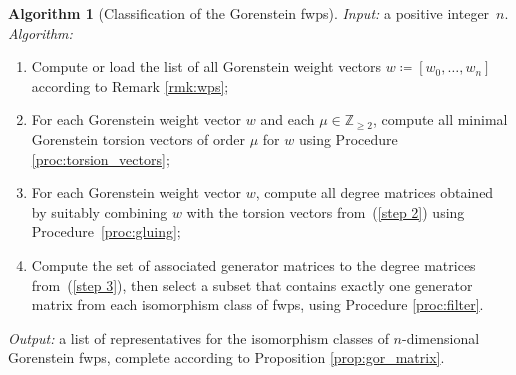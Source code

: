 \documentclass{amsart}
\newcommand{\Z}{\mathbb{Z}}
\theoremstyle{definition}
\newtheorem{algorithm}[lem]{Algorithm}
\begin{document}
\begin{algorithm}[Classification of the Gorenstein fwps]\label{algo:classification}
\emph{Input:} a positive integer~$n$.
\emph{Algorithm:}
\begin{enumerate}
  \item\label{step 1} Compute or load the list of all Gorenstein weight vectors $w\coloneqq [w_0,\dots,w_n]$ according to Remark \ref{rmk:wps};
  \item\label{step 2} For each Gorenstein weight vector $w$ and each $\mu\in\Z_{\ge 2}$, compute all minimal Gorenstein torsion vectors of order $\mu$ for $w$ using Procedure \ref{proc:torsion_vectors};
  \item\label{step 3} For each Gorenstein weight vector $w$, compute all degree matrices obtained by suitably combining $w$ with the torsion vectors from~(\ref{step 2}) using Procedure~\ref{proc:gluing};
  \item\label{step 4} Compute the set of associated generator matrices to the degree matrices from~(\ref{step 3}), then select a subset that contains exactly one generator matrix from each isomorphism class of fwps, using Procedure \ref{proc:filter}.
\end{enumerate}
\emph{Output:} a list of representatives for the isomorphism classes of $n$-dimensional Gorenstein fwps, complete according to Proposition \ref{prop:gor_matrix}.\\
\end{algorithm}
\end{document}
